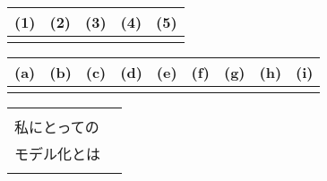 

\begin{table}[htb]
    \begin{center} 
      \begin{tabular}{|p{}|p{}|p{}|p{}|p{}|} \hline
        (1) & (2) & (3) & (4) & (5)\\ \hline \hline
          &  & & &  \\ \hline		
      \end{tabular}
    \end{center}
  \end{table}

  \begin{table}[htb]
    \begin{center} 
      \begin{tabular}{|p{}|p{}|p{}|p{}|p{}|p{}|p{}|p{}|p{}|} \hline
        (a) & (b) & (c) & (d) & (e) & (f) & (g) & (h) & (i)\\ \hline
          &  & & & & & & &  \\ \hline		
      \end{tabular}
    \end{center}
  \end{table}

\begin{table}[htb]
  \begin{center} 
    \begin{tabular}{|l|p{}|} \hline
      & \\
      私にとっての  & \\
      モデル化とは  & \\ 
      & \\ \hline
    \end{tabular}
  \end{center}
\end{table}

